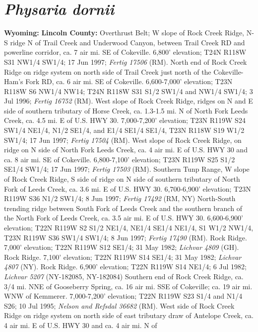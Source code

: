 \section*{\textit{Physaria dornii}}

  \textbf{Wyoming:}
  \textbf{Lincoln County:}
Overthrust Belt; W slope of Rock Creek Ridge, N-S ridge N of Trail Creek and
Underwood Canyon, between Trail Creek RD and powerline corridor, ca. 7 air mi.
SE of Cokeville. 6,800' elevation; T24N R118W S31 NW1/4 SW1/4; 17 Jun 1997;
\textit{Fertig 17506} (RM).
North end of Rock Creek Ridge on ridge system on north side of
Trail Creek just north of the Cokeville-Ham's Fork RD, ca. 6 air mi. SE of
Cokeville. 6,600-7,000' elevation; T23N R118W S6 NW1/4 NW14; T24N R118W S31
S1/2 SW1/4 and NW1/4 SW1/4; 3 Jul 1996; \textit{Fertig 16752} (RM).
West slope of Rock Creek Ridge, ridges on N and E side of southern tributary of
Horse Creek, ca. 1.3-1.5 mi. N of North Fork Leeds Creek, ca. 4.5 mi. E of U.S.
HWY 30. 7,000-7,200' elevation; T23N R119W S24 SW1/4 NE1/4, N1/2 SE1/4,
and E1/4 SE1/4 SE1/4, T23N R118W S19 W1/2 SW1/4; 17 Jun 1997;
\textit{Fertig 17504} (RM).
West slope of Rock Creek Ridge, on ridge on N side of North Fork Leeds Creek,
ca. 4 air mi. E of U.S. HWY 30 and ca. 8 air mi. SE of Cokeville.
6,800-7,100' elevation; T23N R119W S25 S1/2 SE1/4 SW1/4; 17 Jun 1997;
\textit{Fertig 17503} (RM).
Southern Tunp Range, W slope of Rock Creek Ridge, S side of ridge on N side of
southern tributary of North Fork of Leeds Creek, ca. 3.6 mi. E of U.S. HWY 30.
6,700-6,900' elevation; T23N R119W S36 N1/2 SW1/4; 8 Jun 1997;
\textit{Fertig 17492} (RM, NY)
North-South trending ridge between South Fork of Leeds Creek and the southern
branch of the North Fork of Leeds Creek, ca. 3.5 air mi. E of U.S. HWY 30.
6,600-6,900' elevation; T22N R119W S2 S1/2 NE1/4, NE1/4 SE1/4 NE1/4,
S1 W1/2 NW1/4, T23N R119W S36 SW1/4 SW1/4; 8 Jun 1997;
\textit{Fertig 17490} (RM).
Rock Ridge. 7,000' elevation; T22N R119W S12 SE1/4; 31 May 1982;
\textit{Lichvar 4809} (GH).
Rock Ridge. 7,100' elevation; T22N R119W S14 SE1/4; 31 May 1982;
\textit{Lichvar 4807} (NY).
Rock Ridge. 6,900' elevation; T22N R119W S14 NE1/4; 6 Jul 1982;
\textit{Lichvar 5207} (NY-182085, NY-182084)
Southern end of Rock Creek Ridge, ca. 3/4 mi. NNE of Gooseberry Spring,
ca. 16 air mi. SSE of Cokeville; ca. 19 air mi. WNW of Kemmerer.
7,000-7,200' elevation; T22N R119W S23 S1/4 and N1/4 S26; 10 Jul 1995;
\textit{Nelson and Refsdal 36682} (RM).
West side of Rock Creek Ridge on ridge system on north side of east tributary
draw of Antelope Creek, ca. 4 air mi. E of U.S. HWY 30 and ca. 4 air mi. N of
